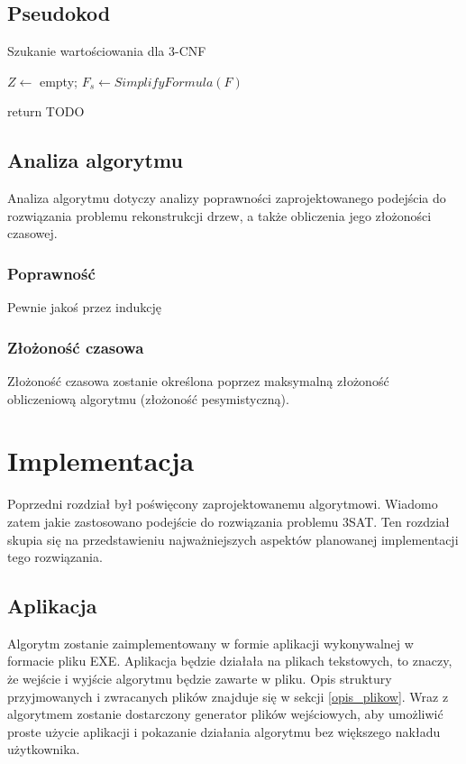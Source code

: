 \documentclass[a4paper,11pt,twoside]{report}
\theoremstyle{definition}
\begin{document}
\section{Pseudokod}

\vspace{-20pt}
\begin{algorithm}[H]
\caption{Szukanie wartościowania dla 3-CNF}\label{alg:3SAT}

$Z \gets$  empty; $F_s \gets SimplifyFormula(F)$\; %


return TODO\;
\end{algorithm}

\section{Analiza algorytmu}

Analiza algorytmu dotyczy analizy poprawności zaprojektowanego podejścia do rozwiązania problemu rekonstrukcji drzew, a także obliczenia jego złożoności czasowej.

\subsection{Poprawność}
Pewnie jakoś przez indukcję

\subsection{Złożoność czasowa}
Złożoność czasowa zostanie określona poprzez maksymalną złożoność obliczeniową algorytmu (złożoność pesymistyczną).

\chapter{Implementacja}

Poprzedni rozdział był poświęcony zaprojektowanemu algorytmowi. Wiadomo zatem jakie zastosowano podejście do rozwiązania problemu 3SAT. Ten rozdział skupia się na przedstawieniu najważniejszych aspektów planowanej implementacji tego rozwiązania.

\section{Aplikacja}

Algorytm zostanie zaimplementowany w formie aplikacji wykonywalnej w formacie pliku EXE. Aplikacja będzie działała na plikach tekstowych, to znaczy, że wejście i wyjście algorytmu będzie zawarte w pliku. Opis struktury przyjmowanych i zwracanych plików znajduje się w sekcji \ref{opis_plikow}. Wraz z algorytmem zostanie dostarczony generator plików wejściowych, aby umożliwić proste użycie aplikacji i pokazanie działania algorytmu bez większego nakładu użytkownika.
\end{document}
